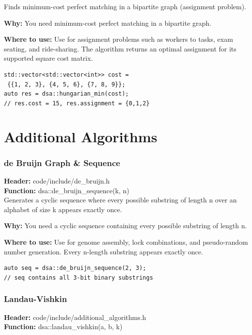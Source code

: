 \documentclass[11pt]{article}
\begin{document}
Finds minimum-cost perfect matching in a bipartite graph (assignment problem).

\textbf{Why:} You need minimum-cost perfect matching in a bipartite graph. \par \textbf{Where to use:} Use for assignment problems such as workers to tasks, exam seating, and ride-sharing. The algorithm returns an optimal assignment for its supported square cost matrix.

\begin{lstlisting}
std::vector<std::vector<int>> cost =
 {{1, 2, 3}, {4, 5, 6}, {7, 8, 9}};
auto res = dsa::hungarian_min(cost);
// res.cost = 15, res.assignment = {0,1,2}
\end{lstlisting}


\section{Additional Algorithms}

\subsubsection{de Bruijn Graph \& Sequence}
\textbf{Header:} code/include/de\_bruijn.h\\
\textbf{Function:} dsa::de\_bruijn\_sequence(k, n)\\

Generates a cyclic sequence where every possible substring of length n over an alphabet of size k appears exactly once.

\textbf{Why:} You need a cyclic sequence containing every possible substring of length n. \par \textbf{Where to use:} Use for genome assembly, lock combinations, and pseudo-random number generation. Every n-length substring appears exactly once.

\begin{lstlisting}
auto seq = dsa::de_bruijn_sequence(2, 3);
// seq contains all 3-bit binary substrings
\end{lstlisting}

\subsubsection{Landau-Vishkin}
\textbf{Header:} code/include/additional\_algorithms.h\\
\textbf{Function:} dsa::landau\_vishkin(a, b, k)\\
\end{document}
